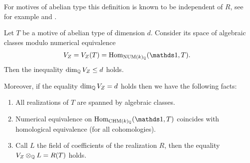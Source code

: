 \begin{remark}
\notready\label{remarkrank}
For motives of abelian type this definition is known to be independent of $R$, see for example  \cite[Corollary 3.5]{jannsen} and \cite[Corollary 1.6]{Ascona}.
\end{remark}
\begin{prop}
\notready\label{motivisupersingolari}
Let $T$ be a motive of abelian type of dimension $d$.
Consider   its space of algebraic classes modulo numerical equivalence \[V_Z = V_Z(T) =  \Hom_{\NUM(k)_\Q}(\one, T).\] Then the  inequality
$\dim_{\mathbb{Q}} V_Z \leq d$ holds.

Moreover, if the equality $\dim_{\mathbb{Q}} V_Z = d$ holds then we have the following facts:

\begin{enumerate}
\item All  realizations of $T$ are spanned by algebraic classes.
\item Numerical equivalence on $\Hom_{\CHM(k)_\Q}(\one,T)$ coincides with  homological equivalence (for all  cohomologies).
\item Call $L$ the field of coefficients of the realization $R$, then the equality $V_Z\otimes _{\mathbb{Q}} L = R(T)$ holds.
\end{enumerate}
\end{prop}
